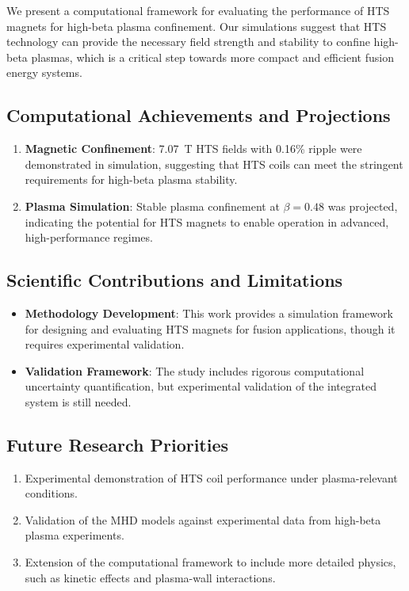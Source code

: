 \documentclass[10pt,twocolumn]{article}
\begin{document}
We present a computational framework for evaluating the performance of HTS magnets for high-beta plasma confinement. Our simulations suggest that HTS technology can provide the necessary field strength and stability to confine high-beta plasmas, which is a critical step towards more compact and efficient fusion energy systems.

\subsection{Computational Achievements and Projections}
\begin{enumerate}
\item \textbf{Magnetic Confinement}: 7.07~T HTS fields with 0.16\% ripple were demonstrated in simulation, suggesting that HTS coils can meet the stringent requirements for high-beta plasma stability.
\item \textbf{Plasma Simulation}: Stable plasma confinement at $\beta=0.48$ was projected, indicating the potential for HTS magnets to enable operation in advanced, high-performance regimes.
\end{enumerate}

\subsection{Scientific Contributions and Limitations}
\begin{itemize}
\item \textbf{Methodology Development}: This work provides a simulation framework for designing and evaluating HTS magnets for fusion applications, though it requires experimental validation.
\item \textbf{Validation Framework}: The study includes rigorous computational uncertainty quantification, but experimental validation of the integrated system is still needed.
\end{itemize}

\subsection{Future Research Priorities}
\begin{enumerate}
\item Experimental demonstration of HTS coil performance under plasma-relevant conditions.
\item Validation of the MHD models against experimental data from high-beta plasma experiments.
\item Extension of the computational framework to include more detailed physics, such as kinetic effects and plasma-wall interactions.
\end{enumerate}
\end{document}
